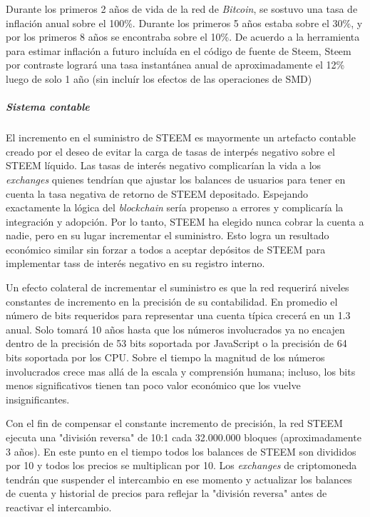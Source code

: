 \documentclass[a4paper,titlepage,final]{article}
\begin{document}
Durante los primeros 2 años de vida de la red de \textit{Bitcoin}, se sostuvo una tasa de inflación anual \cite{20} sobre el 100\%. Durante los primeros 5 años estaba sobre el 30\%, y por los primeros 8 años se encontraba sobre el 10\%. De acuerdo a la herramienta para estimar inflación a futuro incluída en el código de fuente de Steem, Steem por contraste logrará una tasa instantánea anual de aproximadamente el 12\% luego de solo 1 año (sin incluír los efectos de las operaciones de SMD)

\subparagraph{Sistema contable}

El incremento en el suministro de STEEM es mayormente un artefacto contable creado por el deseo de evitar la carga de tasas de interpés negativo sobre el STEEM líquido. Las tasas de interés negativo complicarían la vida a los \textit{exchanges} quienes tendrían que ajustar los balances de usuarios para tener en cuenta la tasa negativa de retorno de STEEM depositado. Espejando exactamente la lógica del \textit{blockchain} sería propenso a errores y complicaría la integración y adopción. Por lo tanto, STEEM ha elegido nunca cobrar la cuenta a nadie, pero en su lugar incrementar el suministro. Esto logra un resultado económico similar sin forzar a todos a aceptar depósitos de STEEM para implementar tass de interés negativo en su registro interno.

Un efecto colateral de incrementar el suministro es que la red requerirá niveles constantes de incremento en la precisión de su contabilidad. En promedio el número de bits requeridos para representar una cuenta típica crecerá en un 1.3 anual. Solo tomará 10 años hasta que los números involucrados ya no encajen dentro de la precisión de 53 bits soportada por JavaScript o la precisión de 64 bits soportada por los CPU. Sobre el tiempo la magnitud de los números involucrados crece mas allá de la escala y comprensión humana; incluso, los bits menos significativos tienen tan poco valor económico que los vuelve insignificantes.

Con el fin de compensar el constante incremento de precisión, la red STEEM ejecuta una "división reversa" de 10:1 cada 32.000.000 bloques (aproximadamente 3 años). En este punto en el tiempo todos los balances de STEEM son divididos por 10 y todos los precios se multiplican por 10. Los \textit{exchanges} de criptomoneda tendrán que suspender el intercambio en ese momento y actualizar los balances de cuenta y historial de precios para reflejar la "división reversa" antes de reactivar el intercambio.
\end{document}
